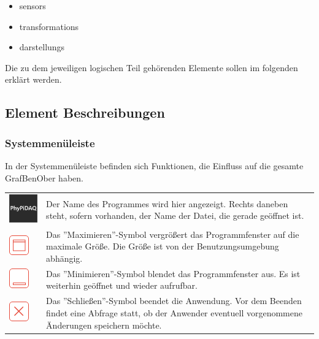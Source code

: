 \documentclass[parskip=full]{scrartcl}
\begin{document}
\begin{itemize}
	\item \glspl{sensor}
	\item \glspl{transformation}
	\item \glspl{darstellung}
\end{itemize}

Die zu dem jeweiligen logischen Teil gehörenden Elemente sollen im folgenden erklärt werden.

\subsection{Element Beschreibungen}

\subsubsection{Systemmenüleiste}
In der Systemmenüleiste befinden sich Funktionen, die Einfluss auf die gesamte \gls{GrafBenOber} haben.

\begin{tabular}[t]{p{1cm} p{10cm}} %
	\vspace{0cm}\includegraphics[width = 1 cm]{Grafik/PhyPiDAQ.png} & Der Name des Programmes wird hier angezeigt. Rechts daneben steht, sofern vorhanden, der Name der Datei, die gerade geöffnet ist.\newline\\
	\vspace{0cm}\includegraphics[width = 1 cm]{Grafik/Maximieren.png} & Das ''Maximieren''-Symbol vergrößert das Programmfenster auf die maximale Größe. Die Größe ist von der Benutzungsumgebung abhängig.\newline\\
	\vspace{0cm}\includegraphics[width = 1 cm]{Grafik/Minimieren.png} & Das ''Minimieren''-Symbol blendet das Programmfenster aus. Es ist weiterhin geöffnet und wieder aufrufbar. \\
	\vspace{0cm}\includegraphics[width = 1 cm]{Grafik/Schliessen.png} & Das ''Schließen''-Symbol beendet die Anwendung. Vor dem Beenden findet eine Abfrage statt, ob der Anwender eventuell vorgenommene Änderungen speichern möchte.\\
\end{tabular}
\end{document}
